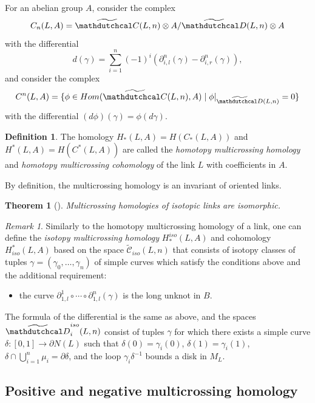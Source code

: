 \documentclass{article}
\newtheorem{theorem}{Theorem}
\theoremstyle{definition}
\newtheorem{definition}{Definition}
\theoremstyle{remark}
\newtheorem{remark}{Remark}
\begin{document}
For an abelian group $A$, consider the complex
\[
    C_n(L,A)=\widetilde{\mathdutchcal C}(L,n)\otimes A/\widetilde{\mathdutchcal D}(L,n)\otimes A
\]
with the differential
\[
d(\gamma)=\sum_{i=1}^n(-1)^i(\partial^n_{i,l}(\gamma)-\partial^n_{i,r}(\gamma)),
\]
and consider the complex
\[
    C^n(L,A)=\{\phi\in Hom(\widetilde{\mathdutchcal C}(L,n),A)\mid \phi|_{\widetilde{\mathdutchcal D}(L,n)}=0\}
\]
with the differential $(d\phi)(\gamma)=\phi(d\gamma)$.

\begin{definition}\label{def:homotopy_crossing_homology}
    The homology $H_*(L,A)=H(C_*(L,A))$ and $H^*(L,A)=H(C^*(L,A))$ are called the \emph{homotopy multicrossing homology} and \emph{homotopy multicrossing cohomology} of the link $L$ with coefficients in $A$.
\end{definition}

By definition, the multicrossing homology is an invariant of oriented links.
\begin{theorem}[\cite{Nca}]
Multicrossing homologies of isotopic links are isomorphic.
\end{theorem}

\begin{remark}
    Similarly to the homotopy multicrossing homology of a link, one can define the \emph{isotopy multicrossing homology} $H^{iso}_*(L,A)$ and cohomology $H_{iso}^*(L,A)$ based on the space $\widetilde{\mathcal C}_{iso}(L,n)$ that consists of isotopy classes of tuples $\gamma=(\gamma_0,\dots,\gamma_n)$ of simple curves which satisfy the conditions above and the additional requirement:
\begin{itemize}
    \item the curve $\partial^1_{1,l}\circ\cdots\circ\partial^n_{1,l}(\gamma)$ is the long unknot in $B$.
\end{itemize}
The formula of the differential is the same as above, and the spaces $\widetilde{\mathdutchcal D}^{iso}_i(L,n)$ consist of tuples $\gamma$ for which
there exists a simple curve $\delta\colon[0,1]\to\partial N(L)$ such that $\delta(0)=\gamma_i(0)$, $\delta(1)=\gamma_i(1)$, $\delta\cap\bigcup_{i=1}^n\mu_i=\partial\delta$, and the loop $\gamma_i\delta^{-1}$ bounds a disk in $M_L$.
\end{remark}

\subsection{Positive and negative multicrossing homology}
\end{document}
